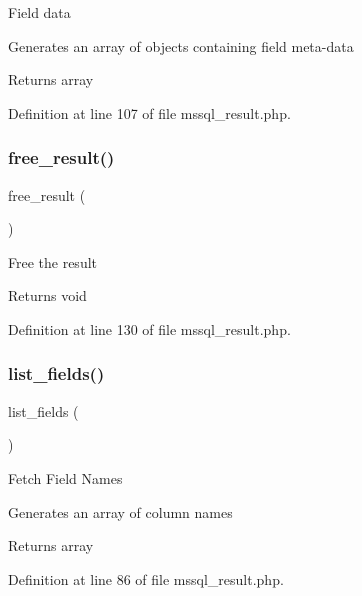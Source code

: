 Field data

Generates an array of objects containing field meta-\/data

\begin{DoxyReturn}{Returns}
array 
\end{DoxyReturn}


Definition at line 107 of file mssql\+\_\+result.\+php.

\mbox{\label{class_c_i___d_b__mssql__result_aad2d98d6beb3d6095405356c6107b473}} 
\subsubsection{\texorpdfstring{free\_result()}{free\_result()}}
{\footnotesize\ttfamily free\+\_\+result (\begin{DoxyParamCaption}{ }\end{DoxyParamCaption})}

Free the result

\begin{DoxyReturn}{Returns}
void 
\end{DoxyReturn}


Definition at line 130 of file mssql\+\_\+result.\+php.

\mbox{\label{class_c_i___d_b__mssql__result_a50b54eb4ea7cfd039740f532988ea776}} 
\subsubsection{\texorpdfstring{list\_fields()}{list\_fields()}}
{\footnotesize\ttfamily list\+\_\+fields (\begin{DoxyParamCaption}{ }\end{DoxyParamCaption})}

Fetch Field Names

Generates an array of column names

\begin{DoxyReturn}{Returns}
array 
\end{DoxyReturn}


Definition at line 86 of file mssql\+\_\+result.\+php.

